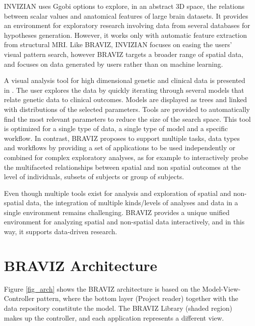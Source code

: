 \documentclass{frontiersHLTH}
\begin{document}
INVIZIAN \cite{bowman_query-based_2011, bowman_feature-similarity_2012, bowman_visual_2012} uses Ggobi options to explore, in an abstract 3D space, the relations between scalar values and anatomical features of large brain datasets. It provides an environment for exploratory research involving data from several databases for hypotheses generation. However, it works only with automatic feature extraction from structural MRI. Like BRAVIZ, INVIZIAN focuses on easing the users' visual pattern search, however BRAVIZ targets a broader range of spatial data, and focuses on data generated by users rather than on machine learning. 


A visual analysis tool for high dimensional genetic and clinical data is presented in \cite{hinterberg_peax:_2014}. The user explores the data by quickly iterating through several models that relate genetic data to clinical outcomes. Models are displayed as trees and linked with distributions of the selected parameters. Tools are provided to automatically find the most relevant parameters to reduce the size of the search space. This tool is optimized for a single type of data, a single type of model and a specific workflow. In contrast, BRAVIZ proposes to support multiple tasks, data types and workflows by providing a set of  applications to be used independently or combined for complex exploratory analyses, as for example to interactively probe the multifaceted relationships between spatial and non spatial outcomes at the level of individuals, subsets of subjects or group of subjects.
	
Even though multiple tools  exist for analysis and exploration of spatial and non-spatial data, the integration of multiple kinds/levels of analyses and data in a single environment remains challenging. BRAVIZ provides a unique unified environment for analyzing spatial and non-spatial data interactively, and in this way, it supports data-driven research.

\section{BRAVIZ Architecture}

Figure \ref{fig_arch} shows the BRAVIZ architecture is based on the Model-View-Controller pattern, where the bottom layer (Project reader) together with the data repository constitute the model. The  BRAVIZ Library (shaded region) makes up the controller, and each application represents a different view.
\end{document}

